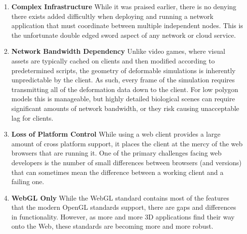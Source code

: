  \begin{enumerate}

   \item \textbf{Complex Infrastructure} While it was praised earlier,
     there is no denying there exists added difficultly when deploying
     and running a network application that must coordinate between
     multiple independent nodes. This is the unfortunate double edged
     sword aspect of any network or cloud service.

   \item \textbf{Network Bandwidth Dependency} Unlike video games,
     where visual assets are typically cached on clients and then
     modified according to predetermined scripts, the geometry of
     deformable simulations is inherently unpredictable by the
     client. As such, every frame of the simulation requires
     transmitting all of the deformation data down to the client. For
     low polygon models this is manageable, but highly detailed
     biological scenes can require significant amounts of network
     bandwidth, or they risk causing unacceptable lag for clients.


     \item \textbf{Loss of Platform Control} While using a web client
       provides a large amount of cross platform support, it places
       the client at the mercy of the web browsers that are running
       it. One of the primary challenges facing web developers is the
       number of small differences between browsers (and versions)
       that can sometimes mean the difference between a working client
       and a failing one.

     \item \textbf{WebGL Only} While the WebGL standard contains most
       of the features that the modern OpenGL standards support, there
       are gaps and differences in functionality. However, as more and
       more 3D applications find their way onto the Web, these
       standards are becoming more and more robust.
     
 \end{enumerate}

